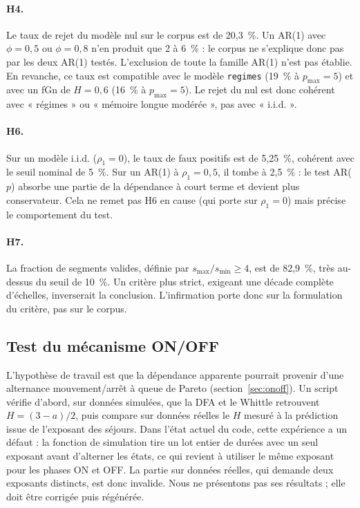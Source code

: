 \documentclass[11pt,a4paper]{article}
\newcommand{\code}[1]{\texttt{#1}}
\renewcommand{\_}{\textunderscore\penalty0\hspace{0pt}}
\begin{document}
\paragraph{H4.} Le taux de rejet du modèle nul sur le corpus est de 20,3~\%. Un AR(1) avec
$\phi=0{,}5$ ou $\phi=0{,}8$ n'en produit que 2 à 6~\% : le corpus ne s'explique donc pas
par les deux AR(1) testés. L'exclusion de toute la famille AR(1) n'est pas établie. En
revanche, ce taux est compatible avec le modèle \code{regimes} (19~\% à $p_{\max}=5$) et avec
un fGn de $H=0{,}6$ (16~\% à $p_{\max}=5$). Le rejet du nul est donc cohérent avec
« régimes » ou « mémoire longue modérée », pas avec « i.i.d. ».

\paragraph{H6.} Sur un modèle i.i.d. ($\rho_1 = 0$), le taux de faux positifs est de
5,25~\%, cohérent avec le seuil nominal de 5~\%. Sur un AR(1) à $\rho_1 = 0{,}5$, il tombe
à 2,5~\% : le test AR($p$) absorbe une partie de la dépendance à court terme et devient plus
conservateur. Cela ne remet pas H6 en cause (qui porte sur $\rho_1 = 0$) mais précise le
comportement du test.

\paragraph{H7.} La fraction de segments valides, définie par $s_{\max}/s_{\min} \ge 4$, est
de 82,9~\%, très au-dessus du seuil de 10~\%. Un critère plus strict, exigeant une décade
complète d'échelles, inverserait la conclusion. L'infirmation porte donc sur la
formulation du critère, pas sur le corpus.

\subsection{Test du mécanisme ON/OFF}
\label{sec:onoff-test}

L'hypothèse de travail est que la dépendance apparente pourrait provenir d'une alternance
mouvement/arrêt à queue de Pareto (section~\ref{sec:onoff}). Un script vérifie d'abord, sur
données simulées, que la DFA et le Whittle retrouvent $H=(3-a)/2$, puis compare sur données
réelles le $H$ mesuré à la prédiction issue de l'exposant des séjours. Dans l'état actuel du
code, cette expérience a un défaut : la fonction de simulation tire un lot entier de durées
avec un seul exposant avant d'alterner les états, ce qui revient à utiliser le même exposant
pour les phases ON et OFF. La partie sur données réelles, qui demande deux exposants
distincts, est donc invalide. Nous ne présentons pas ses résultats ; elle doit être corrigée
puis régénérée.
\end{document}
